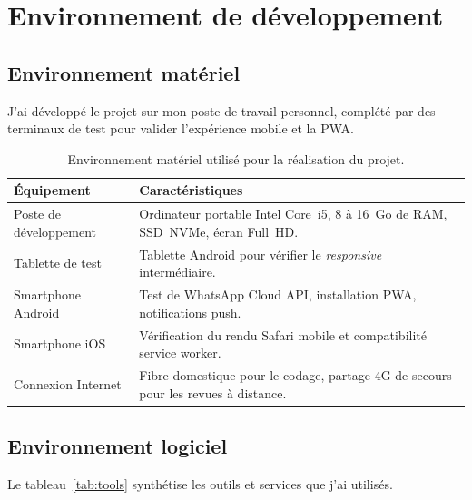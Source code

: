 \section{Environnement de développement}

\subsection{Environnement matériel}
J'ai développé le projet sur mon poste de travail personnel,
complété par des terminaux de test pour valider l'expérience
mobile et la PWA.

\begin{table}[H]
  \centering\small
  \caption{Environnement matériel utilisé pour la réalisation du projet.}
  \label{tab:hw}
  \renewcommand{\arraystretch}{1.4}
  \begin{tabular}{|p{4.2cm}|>{\raggedright\arraybackslash}p{9cm}|}
    \hline\hline
    \textbf{Équipement} & \textbf{Caractéristiques} \\
    \hline
    Poste de développement & Ordinateur portable Intel Core~i5, 8 à 16~Go de RAM, SSD~NVMe, écran Full~HD. \\
    \hline
    Tablette de test & Tablette Android pour vérifier le \emph{responsive} intermédiaire. \\
    \hline
    Smartphone Android & Test de WhatsApp Cloud API, installation PWA, notifications push. \\
    \hline
    Smartphone iOS & Vérification du rendu Safari mobile et compatibilité service worker. \\
    \hline
    Connexion Internet & Fibre domestique pour le codage, partage 4G de secours pour les revues à distance. \\
    \hline\hline
  \end{tabular}
\end{table}

\subsection{Environnement logiciel}
Le tableau~\ref{tab:tools} synthétise les outils et services que
j'ai utilisés.

